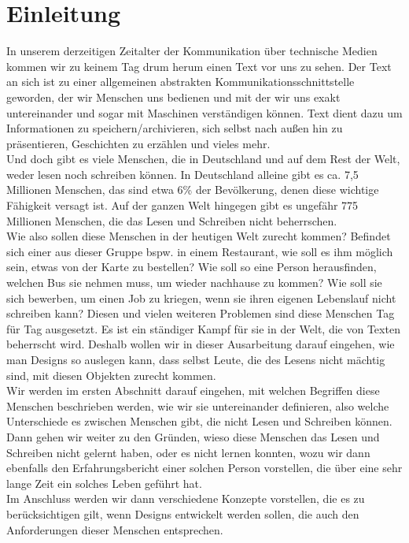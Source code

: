 \section{Einleitung}



In unserem derzeitigen Zeitalter der Kommunikation über technische Medien kommen wir zu keinem Tag drum herum einen Text vor uns zu sehen. Der Text an sich ist zu einer allgemeinen abstrakten Kommunikationsschnittstelle geworden, der wir Menschen uns bedienen und mit der wir uns exakt untereinander und sogar mit Maschinen verständigen können. Text dient dazu um Informationen zu speichern/archivieren, sich selbst nach außen hin zu präsentieren, Geschichten zu erzählen und vieles mehr.\\


Und doch gibt es viele Menschen, die in Deutschland und auf dem Rest der Welt, weder lesen noch schreiben können. In Deutschland alleine gibt es ca. 7,5 Millionen Menschen, das sind etwa 6\% der Bevölkerung, denen diese wichtige Fähigkeit versagt ist. Auf der ganzen Welt hingegen gibt es ungefähr 775 Millionen Menschen, die das Lesen und Schreiben nicht beherrschen. \\


 Wie also sollen diese Menschen in der heutigen Welt zurecht kommen? Befindet sich einer aus dieser Gruppe bspw. in einem Restaurant, wie soll es ihm möglich sein, etwas von der Karte zu bestellen? Wie soll so eine Person herausfinden, welchen Bus sie nehmen muss, um wieder nachhause zu kommen? Wie soll sie sich bewerben, um einen Job zu kriegen, wenn sie ihren eigenen Lebenslauf nicht schreiben kann? Diesen und vielen weiteren Problemen sind diese Menschen Tag für Tag ausgesetzt. Es ist ein ständiger Kampf für sie in der Welt, die von Texten beherrscht wird. Deshalb wollen wir in dieser Ausarbeitung darauf eingehen, wie man Designs so auslegen kann, dass selbst Leute, die des Lesens nicht mächtig sind, mit diesen Objekten zurecht kommen.\\
 Wir werden im ersten Abschnitt darauf eingehen, mit welchen Begriffen diese Menschen beschrieben werden, wie wir sie untereinander definieren, also welche Unterschiede es zwischen Menschen gibt, die nicht Lesen und Schreiben können. Dann gehen wir weiter zu den Gründen, wieso diese Menschen das Lesen und Schreiben nicht gelernt haben, oder es nicht lernen konnten, wozu wir dann ebenfalls den Erfahrungsbericht einer solchen Person vorstellen, die über eine sehr lange Zeit ein solches Leben geführt hat.\\
 Im Anschluss werden wir dann verschiedene Konzepte vorstellen, die es zu berücksichtigen gilt, wenn Designs entwickelt werden sollen, die auch den Anforderungen dieser Menschen entsprechen.


